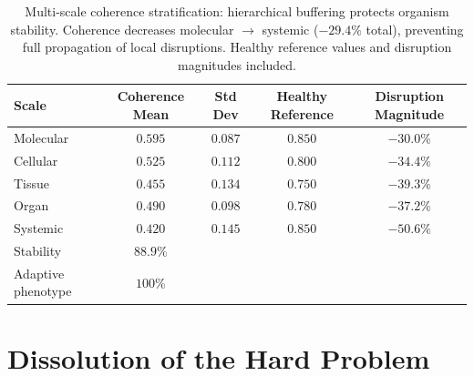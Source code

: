 \begin{table}[!ht]
\centering
\caption{Multi-scale coherence stratification: hierarchical buffering protects
         organism stability.  Coherence decreases molecular $\to$ systemic
         ($-29.4\%$ total), preventing full propagation of local disruptions.
         Healthy reference values and disruption magnitudes included.}
\label{tab:multiscale_coherence}
\small
\begin{tabular}{lcccc}
\toprule
Scale      & Coherence Mean & Std Dev & Healthy Reference & Disruption Magnitude \\
\midrule
Molecular  & $0.595$        & $0.087$ & $0.850$           & $-30.0\%$    \\
Cellular   & $0.525$        & $0.112$ & $0.800$           & $-34.4\%$    \\
Tissue     & $0.455$        & $0.134$ & $0.750$           & $-39.3\%$    \\
Organ      & $0.490$        & $0.098$ & $0.780$           & $-37.2\%$    \\
Systemic   & $0.420$        & $0.145$ & $0.850$           & $-50.6\%$    \\
\midrule
Stability  & $88.9\%$       &         &                   &              \\
Adaptive phenotype & $100\%$ &        &                   &              \\
\bottomrule
\end{tabular}
\end{table}

\section{Dissolution of the Hard Problem}
\label{sec:cc_dissolution}


